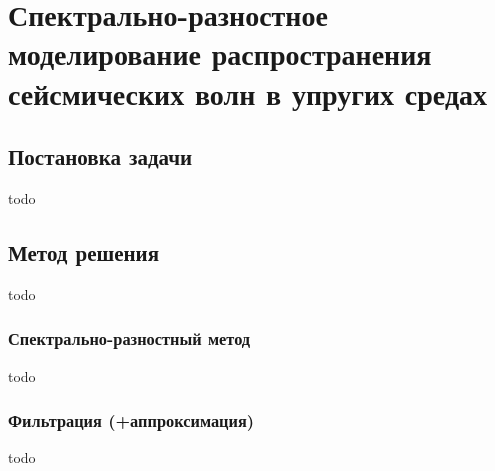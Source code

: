 \section{Спектрально-разностное моделирование распространения сейсмических волн в упругих средах}

\subsection{Постановка задачи}
todo

\subsection{Метод решения}
todo

\subsubsection{Спектрально-разностный метод}
todo

\subsubsection{Фильтрация (+аппроксимация)}
todo

\clearpage